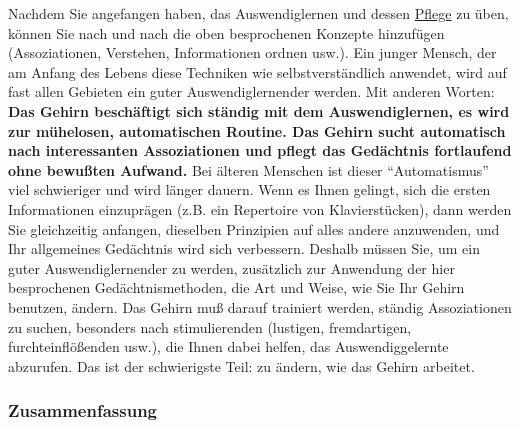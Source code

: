 Nachdem Sie angefangen haben, das Auswendiglernen und dessen \hyperref[c1iii6k]{Pflege} zu üben, können Sie nach und nach die oben besprochenen Konzepte hinzufügen (Assoziationen, Verstehen, Informationen ordnen usw.).
Ein junger Mensch, der am Anfang des Lebens diese Techniken wie selbstverständlich anwendet, wird auf fast allen Gebieten ein guter Auswendiglernender werden.
Mit anderen Worten: \textbf{Das Gehirn beschäftigt sich ständig mit dem Auswendiglernen, es wird zur mühelosen, automatischen Routine.
Das Gehirn sucht automatisch nach interessanten Assoziationen und pflegt das Gedächtnis fortlaufend ohne bewußten Aufwand.}
Bei älteren Menschen ist dieser \enquote{Automatismus} viel schwieriger und wird länger dauern.
Wenn es Ihnen gelingt, sich die ersten Informationen einzuprägen (z.B. ein Repertoire von Klavierstücken), dann werden Sie gleichzeitig anfangen, dieselben Prinzipien auf alles andere anzuwenden, und Ihr allgemeines Gedächtnis wird sich verbessern.
Deshalb müssen Sie, um ein guter Auswendiglernender zu werden, zusätzlich zur Anwendung der hier besprochenen Gedächtnismethoden, die Art und Weise, wie Sie Ihr Gehirn benutzen, ändern.
Das Gehirn muß darauf trainiert werden, ständig Assoziationen zu suchen, besonders nach stimulierenden (lustigen, fremdartigen, furchteinflößenden usw.), die Ihnen dabei helfen, das Auswendiggelernte abzurufen.
Das ist der schwierigste Teil: zu ändern, wie das Gehirn arbeitet.


\subsubsection{Zusammenfassung}
\label{c1iii6o} 

